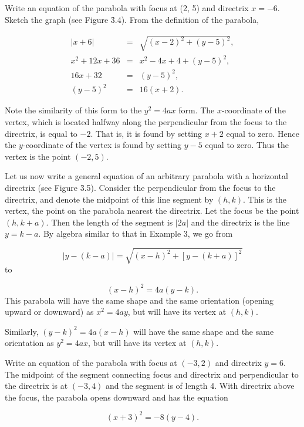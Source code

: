 \begin{example}
Write an equation of the parabola with focus at (2, 5) and directrix $x = -
6$. Sketch the graph (see Figure \f{3.4}). From the definition of the parabola,
 
\begin{eqnarray*}
              |x + 6| &=& \sqrt{(x - 2)^2 + (y - 5)^2}, \\
x^2 + 12x + 36 &=& x^2 - 4x + 4 + (y - 5)^2, \\
          16x + 32 &=& (y- 5)^2,\\
           (y - 5)^2 &=& 16(x + 2).
\end{eqnarray*}

\noindent Note the similarity of this form to the $y^2 = 4ax$ form. The $x$-coordinate of the vertex, which is located halfway along the perpendicular from the focus to the directrix, is equal to $-2$. That is, it is found by setting $x + 2$ equal to zero. Hence the $y$-coordinate of the vertex is found by setting $y - 5$ equal to zero. Thus the vertex is the point $(-2, 5)$.
\end{example}
\medskip
 

Let us now write a general equation of an arbitrary parabola with a horizontal directrix (see Figure \f{3.5}). Consider the perpendicular from the focus to the directrix, and denote the midpoint of this line segment by $(h, k)$. This is the vertex, the point on the parabola nearest the directrix. Let the focus be the point $(h, k + a)$. Then the length of the segment is $|2a|$ and the directrix is the line $y = k - a$. By algebra similar to that in Example 3, we go from

$$
|y - (k - a)| = \sqrt{(x - h)^2 + [y - (k + a)]^2 }
$$
\noindent to

\begin{equation}
(x-h)^2 = 4a(y - k).  
\label{eq3.2.1}
\end{equation}
\noindent This parabola will have the same shape and the same orientation (opening upward or downward) as $x^2 = 4ay$, but will have its vertex at $(h, k)$.

Similarly, $(y-k)^2 = 4a(x - h)$ will have the same shape and the same orientation as $y^2 = 4ax$, but will have its vertex at $(h, k)$.
\medskip

\begin{example}
Write an equation of the parabola with focus at $(-3, 2)$ and directrix $y = 6$. The midpoint of the segment connecting focus and directrix and perpendicular to the directrix is at $(-3, 4)$ and the segment is of length 4. With directrix above the focus, the parabola opens downward and has the equation

$$
(x + 3)^2 = -8(y - 4).
$$
\end{example}

